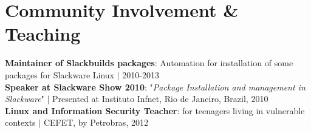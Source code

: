 \documentclass[letterpaper,11pt]{article}
\begin{document}
%
\section{Community Involvement \& Teaching}
 \begin{itemize}[leftmargin=0.15in, label={}]
   \small{\item{
       \small\textbf{Maintainer of Slackbuilds packages}{: Automation for installation of some packages for Slackware Linux} $|$ \tiny{2010-2013} \\
       \small\textbf{Speaker at Slackware Show 2010}{: "\emph{Package Installation and management in Slackware}"} $|$ \tiny{Presented at Instituto Infnet, Rio de Janeiro, Brazil, 2010} \\
       \small\textbf{Linux and Information Security Teacher}{: for teenagers living in vulnerable contexts} $|$ \tiny{CEFET, by Petrobras, 2012} \\
    }}
 \end{itemize}

\end{document}
